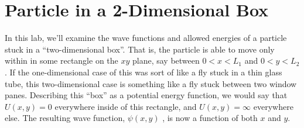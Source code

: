 \section{Particle in a 2-Dimensional Box}

\makelabheader %

\bigskip

In this lab, we'll examine the wave functions and allowed energies of a particle stuck in a ``two-dimensional box''.  That is, the particle is able to move only within in some rectangle on the $xy$ plane, say between $0<x<L_1$ and  $0<y<L_2$.  If the one-dimensional case of this was sort of like a fly stuck in a thin glass tube, this two-dimensional case is something like a fly stuck between two window panes.  Describing this ``box'' as a potential energy function, we would say that $U(x,y)=0$ everywhere inside of this rectangle, and $U(x,y)=\infty$  everywhere else.  The resulting wave function, $\psi(x,y)$ , is now a function of both $x$ and $y$. 

